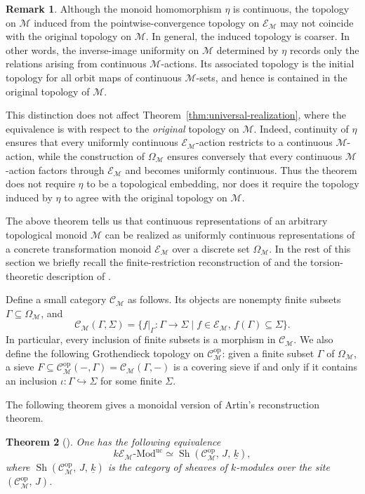 \documentclass[10pt, reqno]{amsart}
\theoremstyle{plain}
\newtheorem{theorem}{Theorem}[section]
\numberwithin{equation}{section}
\theoremstyle{definition}
\newtheorem{remark}[theorem]{Remark}
\newcommand{\Sh}{\operatorname{Sh}}
\newcommand{\Mod}{{\textrm{-}\mathrm{Mod}}}
\newcommand{\op}{\mathrm{op}}
\newcommand{\M}{\mathscr M}
\newcommand{\E}{\mathscr E}
\newcommand{\C}{\mathscr C}
\begin{document}
\begin{remark}
Although the monoid homomorphism $\eta$ is continuous, the topology on $\M$ induced from the pointwise-convergence topology on $\E_\M$ may not coincide with the original topology on $\M$. In general, the induced topology is coarser. In other words, the inverse-image uniformity on $\M$ determined by $\eta$ records only the relations arising from continuous $\M$-actions. Its associated topology is the initial topology for all
orbit maps of continuous $\M$-sets, and hence is contained in the original topology of $\M$.

This distinction does not affect Theorem~\ref{thm:universal-realization}, where the equivalence is with respect to the \emph{original} topology on $\M$. Indeed, continuity of $\eta$ ensures that every uniformly continuous $\E_\M$-action restricts to a continuous $\M$-action, while the construction of $\Omega_\M$ ensures conversely that every continuous $\M$-action factors through $\E_\M$ and becomes uniformly continuous. Thus the theorem does not require $\eta$ to be a topological embedding, nor does it require the topology induced by $\eta$ to agree with the original topology on $\M$.
\end{remark}

The above theorem tells us that continuous representations of an arbitrary topological monoid $\M$ can be realized as uniformly continuous representations of a concrete transformation monoid $\E_\M$ over a discrete set $\Omega_{\M}$. In the rest of this section we briefly recall the finite-restriction reconstruction of \cite{LiRel} and the torsion-theoretic description of \cite{DLL}.

Define a small category $\C_\M$ as follows. Its objects are nonempty finite subsets $\Gamma \subseteq \Omega_\M$, and
\[
\C_\M(\Gamma, \Sigma) = \{f|_\Gamma: \Gamma \to \Sigma \mid f \in \E_{\M},\, f(\Gamma) \subseteq \Sigma\}.
\]
In particular, every inclusion of finite subsets is a morphism in $\C_\M$. We also define the following Grothendieck topology on $\C_\M^{\op}$: given a finite subset $\Gamma$ of $\Omega_\M$, a sieve $F \subseteq \C_\M^{\op}(-, \Gamma) = \C_\M(\Gamma, -)$ is a covering sieve if and only if it contains an inclusion $\iota: \Gamma \hookrightarrow \Sigma$ for some finite $\Sigma$.

The following theorem gives a monoidal version of Artin's reconstruction theorem.

\begin{theorem}[\cite{LiRel}] \label{thm:finite-reconstruction}
One has the following equivalence
\[
k\E_\M \Mod^{\mathrm{uc}} \simeq \Sh(\C_\M^{\op}, \, J, \, \underline{k}),
\]
where $\Sh(\C_\M^{\op}, \, J, \, \underline{k})$ is the category of sheaves of $k$-modules over the site $(\C_\M^{\op}, \, J)$.
\end{theorem}
\end{document}
